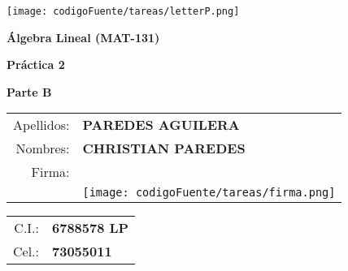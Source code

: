 \begin{flushright}
\texttt{[image: codigoFuente/tareas/letterP.png]}
\end{flushright}

\begin{center}
\textbf{\Large Álgebra Lineal (MAT-131)}

\vspace{.5cm}
\textbf{\large Práctica 2}

\vspace{.2cm}
\textbf{Parte B}
\end{center}

\vspace{.5cm}

\begin{multicols}{2}
    \begin{center}
	\begin{tabular}{rl}
	    Apellidos: & \textbf{PAREDES AGUILERA}\\
	    Nombres: & \textbf{CHRISTIAN PAREDES}\\
	    Firma: & \\
		   &\texttt{[image: codigoFuente/tareas/firma.png]}
	\end{tabular}
	\begin{tabular}{rl}
	    C.I.: & \textbf{6788578 LP}\\
	    Cel.: & \textbf{73055011}
	\end{tabular}
    \end{center}
\end{multicols}

\vspace{.5cm}

